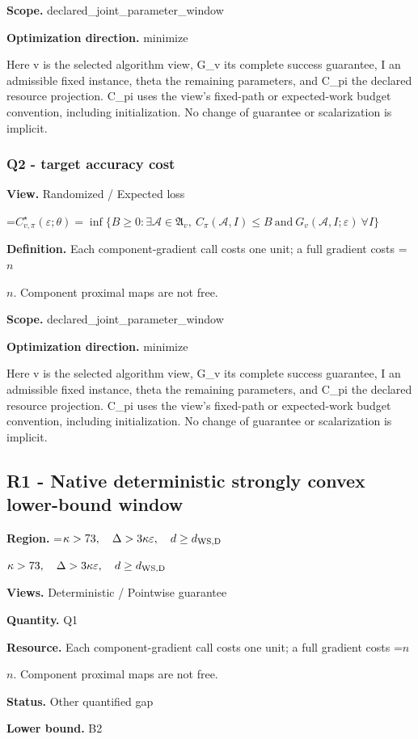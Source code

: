 \documentclass[10pt,a4paper]{article}
\newcommand{\AtlasMath}[1]{\par\begingroup\centering\setbox0=\hbox{$\displaystyle #1$}\ifdim\wd0>1.4\linewidth\typeout{ATLAS WIDE FORMULA: \the\wd0}\fi\ifdim\wd0>\linewidth\resizebox{\linewidth}{!}{\box0}\else\box0\fi\par\endgroup}
\newcommand{\AtlasInlineMath}[1]{\begingroup\setbox0=\hbox{$#1$}\ifdim\wd0>.4\linewidth\endgroup\AtlasMath{#1}\else\endgroup$#1$\fi}
\begin{document}
\textbf{Scope.} declared\_joint\_parameter\_window

\textbf{Optimization direction.} minimize

Here v is the selected algorithm view, G\_v its complete success guarantee, I an admissible fixed instance, theta the remaining parameters, and C\_pi the declared resource projection. C\_pi uses the view's fixed-path or expected-work budget convention, including initialization. No change of guarantee or scalarization is implicit.

\subsubsection{Q2 - target accuracy cost}
\textbf{View.} Randomized / Expected loss

\AtlasMath{C^\star_{v,\pi}(\varepsilon;\theta)=\inf\{B\ge0:\exists\mathcal A\in\mathfrak A_v,\ C_\pi(\mathcal A,I)\le B\ \text{and}\ G_v(\mathcal A,I;\varepsilon)\ \forall I\}}
\textbf{Definition.} Each component-gradient call costs one unit; a full gradient costs \AtlasInlineMath{n}. Component proximal maps are not free.

\textbf{Scope.} declared\_joint\_parameter\_window

\textbf{Optimization direction.} minimize

Here v is the selected algorithm view, G\_v its complete success guarantee, I an admissible fixed instance, theta the remaining parameters, and C\_pi the declared resource projection. C\_pi uses the view's fixed-path or expected-work budget convention, including initialization. No change of guarantee or scalarization is implicit.

\subsection{R1 - Native deterministic strongly convex lower-bound window}
\textbf{Region.} \AtlasInlineMath{\kappa>73,\quad\Delta>3\kappa\varepsilon,\quad d\ge d_{\rm WS,D}}

\textbf{Views.} Deterministic / Pointwise guarantee

\textbf{Quantity.} Q1

\textbf{Resource.} Each component-gradient call costs one unit; a full gradient costs \AtlasInlineMath{n}. Component proximal maps are not free.

\textbf{Status.} Other quantified gap

\textbf{Lower bound.} B2
\end{document}
